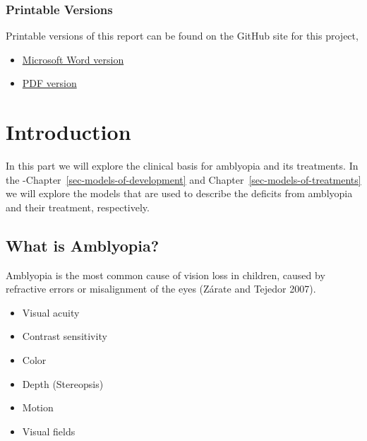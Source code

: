\documentclass[
  letterpaper,
  DIV=11,
  numbers=noendperiod]{scrreprt}
\providecommand{\tightlist}{%
  \setlength{\itemsep}{0pt}\setlength{\parskip}{0pt}}\usepackage{longtable,booktabs,array}
\begin{document}
\hypertarget{printable-versions}{%
\section*{Printable Versions}\label{printable-versions}}

Printable versions of this report can be found on the GitHub site for
this project,

\begin{itemize}
\tightlist
\item
  \href{https://github.com/bblais/Amblyopia-Simulation/raw/main/docs/Comparing-Treatments-for-Amblyopia-with-a-Synaptic-Plasticity-Model.docx}{Microsoft
  Word version}
\item
  \href{https://github.com/bblais/Amblyopia-Simulation/raw/main/docs/Comparing-Treatments-for-Amblyopia-with-a-Synaptic-Plasticity-Model.pdf}{PDF
  version}
\end{itemize}

\part{Introduction}

In this part we will explore the clinical basis for amblyopia and its
treatments. In the -Chapter~\ref{sec-models-of-development} and
Chapter~\ref{sec-models-of-treatments} we will explore the models that
are used to describe the deficits from amblyopia and their treatment,
respectively.

\hypertarget{what-is-amblyopia}{%
\chapter{What is Amblyopia?}\label{what-is-amblyopia}}

Amblyopia is the most common cause of vision loss in children, caused by
refractive errors or misalignment of the eyes (Zárate and Tejedor 2007).

\begin{itemize}
\tightlist
\item
  Visual acuity
\item
  Contrast sensitivity
\item
  Color
\item
  Depth (Stereopsis)
\item
  Motion
\item
  Visual fields
\end{itemize}
\end{document}
